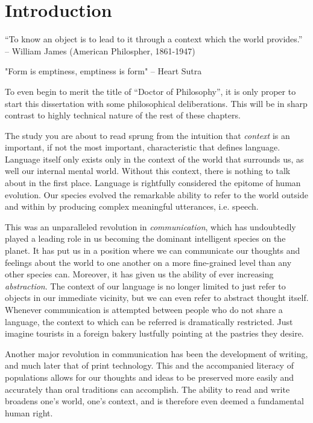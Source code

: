 \chapter{Introduction}

“To know an object is to lead to it through a context which the world
provides.” -- William James (American Philospher, 1861-1947)

"Form is emptiness, emptiness is form" -- Heart Sutra

To even begin to merit the title of ``Doctor of Philosophy'', it is only proper
to start this dissertation with some philosophical deliberations. This will be
in sharp contrast to highly technical nature of the rest of these chapters.

The study you are about to read sprung from the intuition that \emph{context}
is an important, if not the most important, characteristic that defines
language. Language itself only exists only in the context of the world that
surrounds us, as well our internal mental world. Without this context, there is
nothing to talk about in the first place. Language is rightfully considered the
epitome of human evolution. Our species evolved the remarkable ability to refer to the
world outside and within by producing complex meaningful utterances, i.e. speech. 

This was an unparalleled revolution in \emph{communication}, which has
undoubtedly played a leading role in us becoming the dominant intelligent species
on the planet. It has put us in a position where we can communicate our
thoughts and feelings about the world to one another on a more fine-grained
level than any other species can. Moreover, it has given us the ability of ever increasing
\emph{abstraction}. The context of our language is no longer limited to just
refer to objects in our immediate vicinity, but we can even refer to abstract
thought itself. Whenever communication is attempted between people who do not
share a language, the context to which can be referred is dramatically restricted.
Just imagine tourists in a foreign bakery lustfully pointing at the
pastries they desire. 

Another major revolution in communication has been the development of writing,
and much later that of print technology. This and the accompanied literacy of
populations allows for our thoughts and ideas to be preserved more easily and
accurately than oral traditions can accomplish. The ability to read and write
broadens one's world, one's context, and is therefore even deemed a fundamental
human right. 

